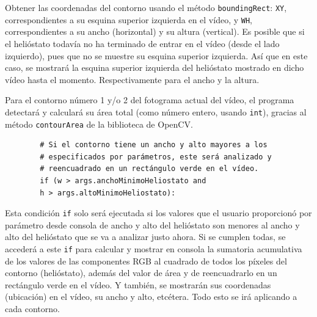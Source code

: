 Obtener las coordenadas del contorno usando el método \verb|boundingRect|: \verb|XY|, correspondientes a su esquina superior izquierda en el vídeo, y \verb|WH|, correspondientes a su ancho (horizontal) y su altura (vertical). Es posible que si el helióstato todavía no ha terminado de entrar en el vídeo (desde el lado izquierdo), pues que no se muestre su esquina superior izquierda. Así que en este caso, se mostrará la esquina superior izquierda del helióstato mostrado en dicho vídeo hasta el momento. Respectivamente para el ancho y la altura.

Para el contorno número 1 y/o 2 del fotograma actual del vídeo, el programa detectará y calculará su área total (como número entero, usando \verb|int|), gracias al método \verb|contourArea| de la biblioteca de OpenCV.

\begin{lstlisting}
        # Si el contorno tiene un ancho y alto mayores a los
        # especificados por parámetros, este será analizado y
        # reencuadrado en un rectángulo verde en el vídeo.
        if (w > args.anchoMinimoHeliostato and
        h > args.altoMinimoHeliostato):
\end{lstlisting}

Esta condición \verb|if| solo será ejecutada si los valores que el usuario proporcionó por parámetro desde consola de ancho y alto del helióstato son menores al ancho y alto del helióstato que se va a analizar justo ahora. Si se cumplen todas, se accederá a este \verb|if| para calcular y mostrar en consola la sumatoria acumulativa de los valores de las componentes RGB al cuadrado de todos los píxeles del contorno (helióstato), además del valor de área y de reencuadrarlo en un rectángulo verde en el vídeo. Y también, se mostrarán sus coordenadas (ubicación) en el vídeo, su ancho y alto, etcétera. Todo esto se irá aplicando a cada contorno.            

